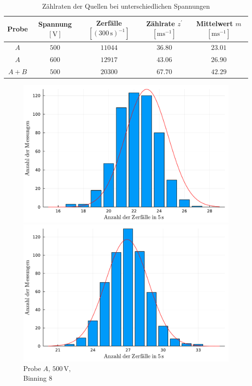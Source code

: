 \documentclass[12pt,a4paper]{scrartcl}
\numberwithin{equation}{section} %
\begin{document}
\begin{table}[h!]
	\centering
	\begin{tabular}{c|c|c|c|c}
		Probe
			& Spannung $[\mathrm V]$
			& Zerfälle $[(300 \mathrm{\, s})^{-1}]$
			& Zählrate $z^\prime$ $[\mathrm{ms^{-1}}]$ &
			Mittelwert $m$ $[\mathrm{ms^{-1}}]$\\
		\hline
		$A$ & $500$ & $11044$ & $36.80$ & $23.01$ \\
		$A$ & $600$ & $12917$ & $43.06$ & $26.90$ \\
		$A+B$ & $500$ & $20300$ & $67.70$ & $42.29$ \\
	\end{tabular}
	\caption{Zählraten der Quellen bei unterschiedlichen Spannungen}
	\label{table:zählraten gauss}
\end{table}
\begin{figure}[h!]
	\centering
	\begin{minipage}{0.3\textwidth}
		\centering
		\includegraphics[width=\textwidth]{../media/B3.1/gauss1.pdf}
		\caption*{Probe $A$, $500 \mathrm{\, V}$,\\Binning $8$}
	\end{minipage}
	\begin{minipage}{0.3\textwidth}
		\centering
		\includegraphics[width=\textwidth]{../media/B3.1/gauss2.pdf}

\end{minipage}
\end{figure}
\end{document}
